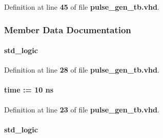 Definition at line {\bf 45} of file {\bf pulse\+\_\+gen\+\_\+tb.\+vhd}.



\subsubsection{Member Data Documentation}
\paragraph[{clk0}]{ {\bfseries \textcolor{comment}{std\+\_\+logic}\textcolor{vhdlchar}{ }} \hspace{0.3cm}{\ttfamily [Signal]}}\label{classpulse__gen__tb_1_1tb__behave_a693d72741b9413130fe2d67511b642be}


Definition at line {\bf 28} of file {\bf pulse\+\_\+gen\+\_\+tb.\+vhd}.

\paragraph[{clk0\+\_\+period}]{ {\bfseries \textcolor{comment}{time}\textcolor{vhdlchar}{ }\textcolor{vhdlchar}{ }\textcolor{vhdlchar}{\+:}\textcolor{vhdlchar}{=}\textcolor{vhdlchar}{ }\textcolor{vhdlchar}{ }\textcolor{vhdlchar}{ } \textcolor{vhdldigit}{10} \textcolor{vhdlchar}{ }\textcolor{vhdlchar}{ns}\textcolor{vhdlchar}{ }} \hspace{0.3cm}{\ttfamily [Constant]}}\label{classpulse__gen__tb_1_1tb__behave_ad03d90619a1930e0f5daa16a616edd90}


Definition at line {\bf 23} of file {\bf pulse\+\_\+gen\+\_\+tb.\+vhd}.

\paragraph[{clk1}]{ {\bfseries \textcolor{comment}{std\+\_\+logic}\textcolor{vhdlchar}{ }} \hspace{0.3cm}{\ttfamily [Signal]}}\label{classpulse__gen__tb_1_1tb__behave_ade95921e47b0e4d2d11e496794648550}


